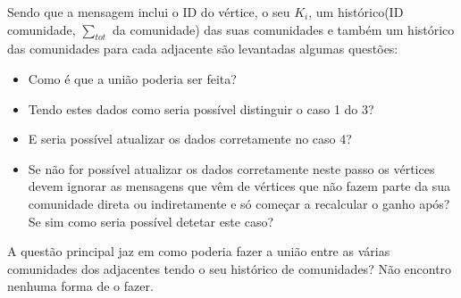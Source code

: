 \documentclass[a4paper,10pt]{report}
\begin{document}
Sendo que a mensagem inclui o ID do vértice, o seu $K_i$, um histórico(ID comunidade, $\sum_{tot}$ da comunidade) das suas comunidades e também um histórico das comunidades para cada adjacente são levantadas algumas questões: 
\begin{itemize}
	\item Como é que a união poderia ser feita? 
	\item Tendo estes dados como seria possível distinguir o caso 1 do 3? 
	\item E seria possível atualizar os dados corretamente no caso 4?
	\item Se não for possível atualizar os dados corretamente neste passo os vértices devem ignorar as mensagens que vêm de vértices que não fazem parte da sua comunidade direta ou indiretamente e só começar a recalcular o ganho após? Se sim como seria possível detetar este caso?
\end{itemize}

A questão principal jaz em como poderia fazer a união entre as várias comunidades dos adjacentes tendo o seu histórico de comunidades? Não encontro nenhuma forma de o fazer.
\end{document}
